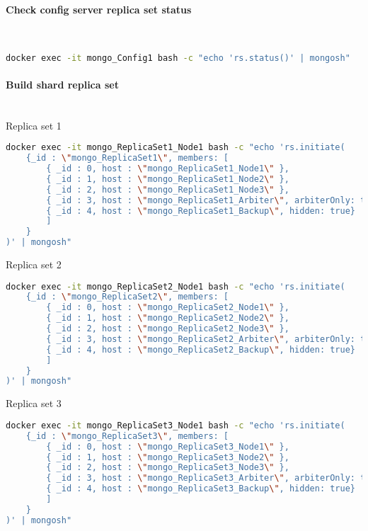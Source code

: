 \paragraph{Check config server replica set status}\mbox{}\\
\begin{lstlisting}[language=Bash, caption=Check replica set status]
docker exec -it mongo_Config1 bash -c "echo 'rs.status()' | mongosh"
\end{lstlisting}

\paragraph{Build shard replica set}\mbox{}\\
Replica set 1
\begin{lstlisting}[language=Bash, caption=Build replica set 1]
docker exec -it mongo_ReplicaSet1_Node1 bash -c "echo 'rs.initiate(
    {_id : \"mongo_ReplicaSet1\", members: [
        { _id : 0, host : \"mongo_ReplicaSet1_Node1\" },
        { _id : 1, host : \"mongo_ReplicaSet1_Node2\" },
        { _id : 2, host : \"mongo_ReplicaSet1_Node3\" },
        { _id : 3, host : \"mongo_ReplicaSet1_Arbiter\", arbiterOnly: true},
        { _id : 4, host : \"mongo_ReplicaSet1_Backup\", hidden: true}
        ]
    }
)' | mongosh"
\end{lstlisting}
Replica set 2
\begin{lstlisting}[language=Bash, caption=Build replica set 2]
docker exec -it mongo_ReplicaSet2_Node1 bash -c "echo 'rs.initiate(
    {_id : \"mongo_ReplicaSet2\", members: [
        { _id : 0, host : \"mongo_ReplicaSet2_Node1\" },
        { _id : 1, host : \"mongo_ReplicaSet2_Node2\" },
        { _id : 2, host : \"mongo_ReplicaSet2_Node3\" },
        { _id : 3, host : \"mongo_ReplicaSet2_Arbiter\", arbiterOnly: true},
        { _id : 4, host : \"mongo_ReplicaSet2_Backup\", hidden: true}
        ]
    }
)' | mongosh"
\end{lstlisting}
Replica set 3
\begin{lstlisting}[language=Bash, caption=Build replica set 3]
docker exec -it mongo_ReplicaSet3_Node1 bash -c "echo 'rs.initiate(
    {_id : \"mongo_ReplicaSet3\", members: [
        { _id : 0, host : \"mongo_ReplicaSet3_Node1\" },
        { _id : 1, host : \"mongo_ReplicaSet3_Node2\" },
        { _id : 2, host : \"mongo_ReplicaSet3_Node3\" },
        { _id : 3, host : \"mongo_ReplicaSet3_Arbiter\", arbiterOnly: true},
        { _id : 4, host : \"mongo_ReplicaSet3_Backup\", hidden: true}
        ]
    }
)' | mongosh"
\end{lstlisting}

